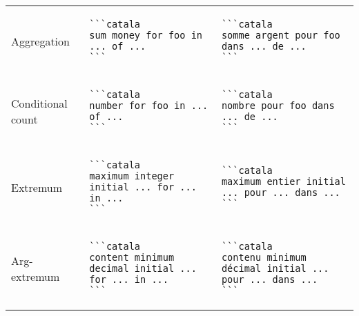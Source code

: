 \documentclass[a3paper,landscape]{article}
\begin{document}
\begin{multicols*}{2}
\begin{center}
\begin{tabular}{p{}p{}p{}}
      \\
      Aggregation        &
      \vspace*{-1.75em}
      \begin{verbatim}
```catala
sum money for foo in ... of ...
```
\end{verbatim}
      \vspace*{-1.75em}
                         &
      \vspace*{-1.75em}
      \begin{verbatim}
```catala
somme argent pour foo dans ... de ...
```
\end{verbatim}
      \vspace*{-1.75em}
      \\
      Conditional count  &
      \vspace*{-1.75em}
      \begin{verbatim}
```catala
number for foo in ... of ...
```
\end{verbatim}
      \vspace*{-1.75em}
                         &
      \vspace*{-1.75em}
      \begin{verbatim}
```catala
nombre pour foo dans ... de ...
```
\end{verbatim}
      \vspace*{-1.75em}
      \\
      Extremum           &
      \vspace*{-1.75em}
      \begin{verbatim}
```catala
maximum integer initial ... for ... in ...
```
\end{verbatim}
      \vspace*{-1.75em}
                         &
      \vspace*{-1.75em}
      \begin{verbatim}
```catala
maximum entier initial ... pour ... dans ...
```
\end{verbatim}
      \vspace*{-1.75em}
      \\
      Arg-extremum       &
      \vspace*{-1.75em}
      \begin{verbatim}
```catala
content minimum decimal initial ... for ... in ...
```
\end{verbatim}
      \vspace*{-1.75em}
                         &
      \vspace*{-1.75em}
      \begin{verbatim}
```catala
contenu minimum décimal initial ... pour ... dans ...
```
\end{verbatim}
      \vspace*{-1.75em}
      \\
      \bottomrule
    \end{tabular}
  \end{center}



\end{multicols*}
\end{document}
